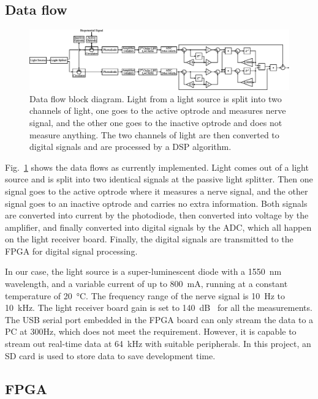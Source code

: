 \subsection{Data flow}

\begin{figure}[h]
\centerline{\includegraphics[width=1\linewidth]{4-ANC_Sys/DataFlow.pdf}}
\caption{Data flow block diagram.  Light from a light source is split into two channels of light, one goes to the active optrode and measures nerve signal, and the other one goes to the inactive optrode and does not measure anything.  The two channels of light are then converted to digital signals and are processed by a DSP algorithm.}
\label{fig_DataFlow}
\end{figure}

Fig.~\ref{fig_DataFlow} shows the data flows as currently implemented.  Light comes out of a light source and is split into two identical signals at the passive light splitter.  Then one signal goes to the active optrode where it measures a nerve signal, and the other signal goes to an inactive optrode and carries no extra information.  Both signals are converted into current by the photodiode, then converted into voltage by the amplifier, and finally converted into digital signals by the ADC, which all happen on the light receiver board.  Finally, the digital signals are transmitted to the FPGA for digital signal processing.

In our case, the light source is a super-luminescent diode with a \qty{1550}{\nm} wavelength, and a variable current of up to \qty{800}{\mA}, running at a constant temperature of \qty{20}{\degreeCelsius}.  The frequency range of the nerve signal is \qty{10}{\Hz} to \qty{10}{\kHz}.  The light receiver board gain is set to \qty{140}{dB\Omega} for all the measurements.  The USB serial port embedded in the FPGA board can only stream the data to a PC at 300Hz, which does not meet the requirement.  However, it is capable to stream out real-time data at \qty{64}{kHz} with suitable peripherals.  In this project, an SD card is used to store data to save development time.


\subsection{FPGA}

